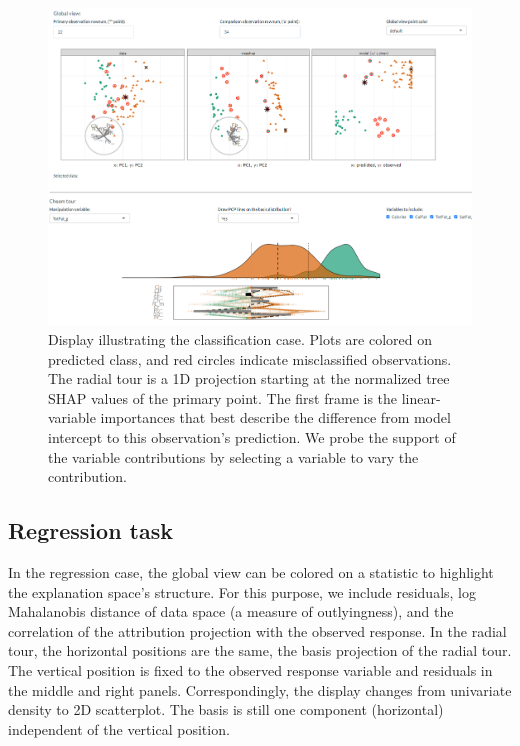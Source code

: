 \documentclass[
]{article}
\begin{document}
\begin{figure}

{\centering \includegraphics[width=1\linewidth]{./figures/app_classification} 

}

\caption{Display illustrating the classification case. Plots are  colored on predicted class, and red circles indicate misclassified observations. The radial tour is a 1D projection starting at the normalized tree SHAP values of the primary point. The first frame is the linear-variable importances that best describe the difference from model intercept to this observation's prediction. We probe the support of the variable contributions by selecting a variable to vary the contribution.}\label{fig:classificationcase}
\end{figure}

\hypertarget{regression-task}{%
\subsection{Regression task}\label{regression-task}}

In the regression case, the global view can be colored on a statistic to
highlight the explanation space's structure. For this purpose, we
include residuals, log Mahalanobis distance of data space (a measure of
outlyingness), and the correlation of the attribution projection with
the observed response. In the radial tour, the horizontal positions are
the same, the basis projection of the radial tour. The vertical position
is fixed to the observed response variable and residuals in the middle
and right panels. Correspondingly, the display changes from univariate
density to 2D scatterplot. The basis is still one component (horizontal)
independent of the vertical position.
\end{document}
